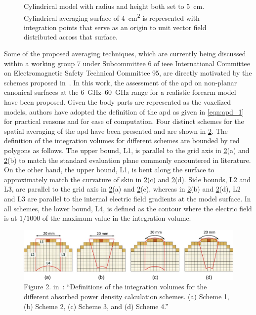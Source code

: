 \begin{figure}[ht]
    \caption{Cylindrical model with radius and height both set to \SI{5}{\cm}. Cylindrical averaging surface of \SI{4}{\cm\squared} is represented with integration points that serve as an origin to unit vector field distributed across that surface.}
    \label{fig:cylinder}
\end{figure}

Some of the proposed averaging techniques, which are currently being discussed within a working group 7 under Subcommittee 6 of \gls{ieee} International Committee on Electromagnetic Safety Technical Committee 95, are directly motivated by the schemes proposed in~\cite{Diao2020Assessment}.
In this work, the assessment of the \gls{apd} on non-planar canonical surfaces at the \SIrange[range-units=single,range-phrase=--]{6}{60}{\GHz} range for a realistic forearm model~\cite{Diao2020Assessment} have been proposed.
Given the body parts are represented as the voxelized models, authors have adopted the definition of the \gls{apd} as given in \cref{eqn:apd_1} for practical reasons and for ease of computation.
Four distinct schemes for the spatial averaging of the \gls{apd} have been presented and are shown in \cref{fig:diao2020assessment}.
The definition of the integration volumes for different schemes are bounded by red polygons as follows.
The upper bound, L1, is parallel to the grid axis in \cref{fig:diao2020assessment}(a) and \cref{fig:diao2020assessment}(b) to match the standard evaluation plane commonly encountered in literature.
On the other hand, the upper bound, L1, is bent along the surface to approximately match the curvature of skin in \cref{fig:diao2020assessment}(c) and \cref{fig:diao2020assessment}(d).
Side bounds, L2 and L3, are parallel to the grid axis in \cref{fig:diao2020assessment}(a) and \cref{fig:diao2020assessment}(c),  whereas in \cref{fig:diao2020assessment}(b) and \cref{fig:diao2020assessment}(d), L2 and L3 are parallel to the internal electric field gradients at the model surface.
In all schemes, the lower bound, L4, is defined as the contour where the electric field is at $1/1000$ of the maximum value in the integration volume.
\begin{figure}[ht]
    \centering
    \includegraphics[width=\textwidth]{artwork/Diao2020Assessment_figure2.png}
    \caption{Figure 2. in~\cite{Diao2020Assessment}: ``Definitions of the integration volumes for the different absorbed power density calculation schemes. (a) Scheme 1, (b) Scheme 2, (c) Scheme 3, and (d) Scheme 4.''}
    \label{fig:diao2020assessment}
\end{figure}
